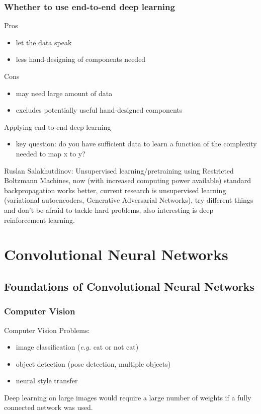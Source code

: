 \documentclass{article}
\begin{document}
\subsubsection{Whether to use end-to-end deep learning}
Pros
\begin{itemize}
  \item let the data speak
  \item less hand-designing of components needed
\end{itemize}
Cons
\begin{itemize}
  \item may need large amount of data
  \item excludes potentially useful hand-designed components
\end{itemize}
Applying end-to-end deep learning
\begin{itemize}
  \item key question: do you have sufficient data to learn a function of the complexity needed to map x to y?
\end{itemize}

Ruslan Salakhutdinov: Unsupervised learning/pretraining using Restricted Boltzmann Machines,
now (with increased computing power available) standard backpropagation works better,
current research is unsupervised learning (variational autoencoders, Generative Adversarial Networks),
try different things and don't be afraid to tackle hard problems, also interesting is deep reinforcement learning.

\section{Convolutional Neural Networks}
\subsection{Foundations of Convolutional Neural Networks}
\subsubsection{Computer Vision}
Computer Vision Problems:
\begin{itemize}
  \item image classification (\emph{e.g.} cat or not cat)
  \item object detection (pose detection, multiple objects)
  \item neural style transfer
\end{itemize}
Deep learning on large images would require a large number of weights if a fully connected network was used.
\end{document}
